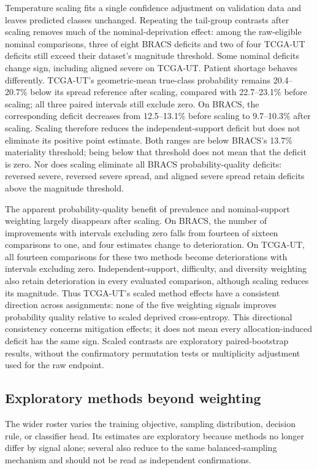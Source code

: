 \documentclass[11pt]{article}
\begin{document}
Temperature scaling fits a single confidence adjustment on validation data and leaves predicted classes unchanged. Repeating the tail-group contrasts after scaling removes much of the nominal-deprivation effect: among the raw-eligible nominal comparisons, three of eight BRACS deficits and two of four TCGA-UT deficits still exceed their dataset's magnitude threshold. Some nominal deficits change sign, including aligned severe on TCGA-UT. Patient shortage behaves differently. TCGA-UT's geometric-mean true-class probability remains \num{20.4}--\num{20.7}\% below its spread reference after scaling, compared with \num{22.7}--\num{23.1}\% before scaling; all three paired intervals still exclude zero. On BRACS, the corresponding deficit decreases from \num{12.5}--\num{13.1}\% before scaling to \num{9.7}--\num{10.3}\% after scaling. Scaling therefore reduces the independent-support deficit but does not eliminate its positive point estimate. Both ranges are below BRACS's \num{13.7}\% materiality threshold; being below that threshold does not mean that the deficit is zero. Nor does scaling eliminate all BRACS probability-quality deficits: reversed severe, reversed severe spread, and aligned severe spread retain deficits above the magnitude threshold.

The apparent probability-quality benefit of prevalence and nominal-support weighting largely disappears after scaling. On BRACS, the number of improvements with intervals excluding zero falls from fourteen of sixteen comparisons to one, and four estimates change to deterioration. On TCGA-UT, all fourteen comparisons for these two methods become deteriorations with intervals excluding zero. Independent-support, difficulty, and diversity weighting also retain deterioration in every evaluated comparison, although scaling reduces its magnitude. Thus TCGA-UT's scaled method effects have a consistent direction across assignments: none of the five weighting signals improves probability quality relative to scaled deprived cross-entropy. This directional consistency concerns mitigation effects; it does not mean every allocation-induced deficit has the same sign. Scaled contrasts are exploratory paired-bootstrap results, without the confirmatory permutation tests or multiplicity adjustment used for the raw endpoint.

\subsection{Exploratory methods beyond weighting}
\label{sec:rq2-roster}
The wider roster varies the training objective, sampling distribution, decision rule, or classifier head. Its estimates are exploratory because methods no longer differ by signal alone; several also reduce to the same balanced-sampling mechanism and should not be read as independent confirmations.
\end{document}
